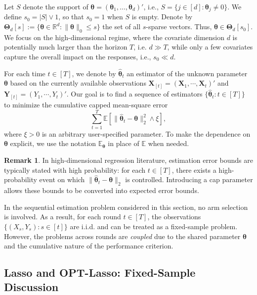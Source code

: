 \documentclass[aos,preprint]{imsart}
\theoremstyle{plain}
\theoremstyle{definition}
\newtheorem{remark}{Remark}
\newcommand{\bTheta}{\boldsymbol{\Theta}}
\newcommand{\btheta}{\boldsymbol{\theta}}
\newcommand{\hbtheta}{\widehat{\boldsymbol{\theta}}}
\newcommand{\bX}{\boldsymbol{X}}
\newcommand{\mR}{\mathbb{R}}
\newcommand{\bY}{\boldsymbol{Y}}
\newcommand{\Exp}{\mathbb{E}}
\begin{document}
Let $S$ denote the support of $\btheta = (\btheta_1, \ldots, \btheta_d)'$, i.e., $S = \{j \in [d] : \btheta_j \neq 0\}$. We define $s_0 = |S| \vee 1$, so that $s_0 = 1$ when $S$ is empty. Denote by $\bTheta_d[s]:=\{\btheta\in \mR^d: \|\btheta\|_0\leq s\}$ the set of all $s$-sparse vectors. Thus, $\btheta \in \bTheta_d[s_0]$. We focus on the high-dimensional regime, where the covariate dimension $d$  is potentially much larger than the horizon $T$, i.e. $d\gg T$, while only a few covariates capture the overall impact on the responses,  i.e., $s_0 \ll d$. 


For each time $t\in [T]$, we denote by $\hbtheta_t$ an estimator of the unknown parameter $\btheta$ based on the currently available observations $\bX_{[t]} =(\bX_1,\cdots,\bX_t)'$ and $\bY_{[t]} = (Y_1,\cdots,Y_t)'$. Our goal is to find a sequence of estimators $\{\hbtheta_t:t\in [T]\}$ to minimize the cumulative capped mean-square error 
$$
\sum_{t=1}^T \Exp \left[\|\hbtheta_t-\btheta \|_2^2 \wedge \xi\right],
$$
where $\xi>0$ is an arbitrary user-specified parameter. To make the dependence on $\btheta$ explicit, we use the notation   $\Exp_{\btheta}$ in place of $\Exp$ when needed.

\begin{remark}
In high-dimensional regression literature, estimation error bounds are typically stated with high probability: for each $t \in [T]$, there exists a high-probability event on which $\|\hbtheta_t - \btheta\|_2$ is controlled. Introducing a cap parameter allows these bounds to be converted into expected error bounds.
\end{remark}

In the sequential estimation problem considered in this section, no arm selection is involved. As a result, for each round $t \in [T]$, the observations $\{(X_s, Y_s): s \in [t]\}$ are i.i.d. and can be treated as a fixed-sample problem. However, the problems across rounds are \textit{coupled} due to the shared parameter $\btheta$ and the cumulative nature of the performance criterion.


\subsection{Lasso and OPT-Lasso: Fixed-Sample Discussion} \label{subsec:lasso_and_opt_lasso}
\end{document}
